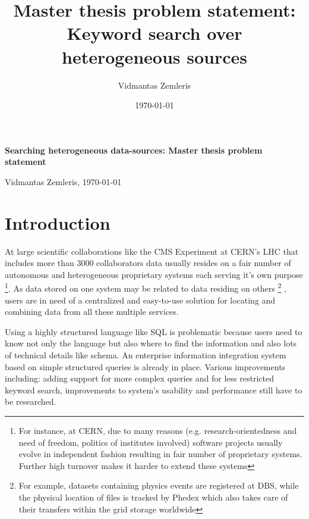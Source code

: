\documentclass[a4paper,11pt]{article}
\begin{document}
\addtolength{\textheight}{10mm}

 
\title{Master thesis problem statement: Keyword search over heterogeneous sources} %
\author{Vidmantas Zemleris}  %
\date{\today}  %
 

%
 \centerline{\Large \bf Searching heterogeneous data-sources: Master thesis problem statement} %
 \medskip
 
 \centerline{Vidmantas Zemleris, \today}  %
 \medskip
 


 
\section{Introduction}
At large scientific collaborations like the CMS Experiment at CERN's LHC that includes more than 3000 collaborators data usually resides on a fair number of autonomous and heterogeneous proprietary systems each serving it's own purpose
\footnote{For instance, at CERN,  due to many reasons (e.g. research-orientedness and need of freedom, politics of institutes involved) software projects usually evolve in independent fashion resulting in fair number of proprietary systems\cite{Koch00CERN}. Further high turnover makes it harder to extend these systems}. As data stored on one system may be related to data residing on others%
	\footnote{For example, datasets containing physics events are registered at DBS, while the physical location of files is tracked by Phedex which also takes care of their transfers within the grid storage worldwide}%
, users are in need of a centralized and easy-to-use solution for locating and combining data from all these multiple services.

Using a highly structured language like SQL is problematic because users need to know not only the language but also where to find the information and also lots of technical details like schema. An enterprise information integration system based on simple structured queries is already in place. Various improvements including: adding support for more complex queries and for less restricted keyword search, improvements to system's usability and performance still have to be researched.
\end{document}
